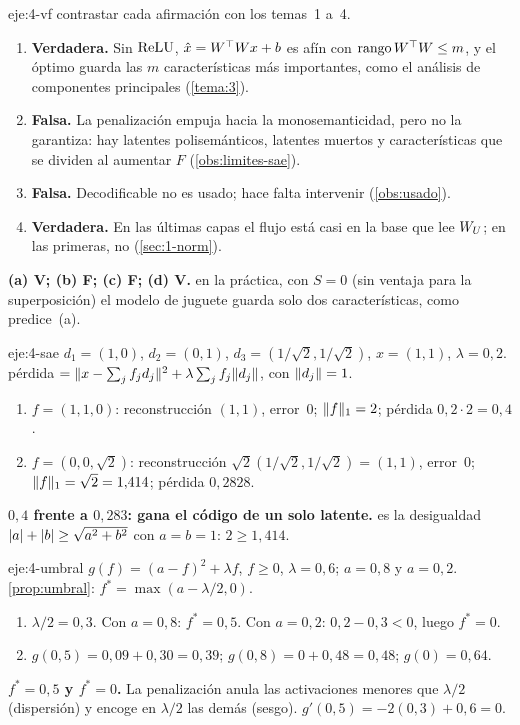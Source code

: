\begin{solucion}{eje:4-vf}
\planteamiento contrastar cada afirmación con los temas~1 a~4.
\pasos
\begin{enumerate}[label=(\alph*)]
  \item \textbf{Verdadera.} Sin $\operatorname{ReLU}$, $\hat x=W^{\top} Wx+b$ es afín con $\operatorname{rango} W^{\top} W\le m$, y el óptimo guarda las $m$ características más importantes, como el análisis de componentes principales (\cref{tema:3}).
  \item \textbf{Falsa.} La penalización empuja hacia la monosemanticidad, pero no la garantiza: hay latentes polisemánticos, latentes muertos y características que se dividen al aumentar $F$ (\cref{obs:limites-sae}).
  \item \textbf{Falsa.} Decodificable no es usado; hace falta intervenir (\cref{obs:usado}).
  \item \textbf{Verdadera.} En las últimas capas el flujo está casi en la base que lee $W_{U}$; en las primeras, no (\cref{sec:1-norm}).
\end{enumerate}
\resultado \textbf{(a) V; (b) F; (c) F; (d) V.}
\comprobacion en la práctica, con $S=0$ (sin ventaja para la superposición) el modelo de juguete guarda solo dos características, como predice~(a).
\end{solucion}

\begin{solucion}{eje:4-sae}
\datos $d_1=(1,0)$, $d_2=(0,1)$, $d_3=(1/\sqrt2,1/\sqrt2)$, $x=(1,1)$, $\lambda=0{,}2$.
\planteamiento pérdida $=\lVert x-\sum_jf_jd_j\rVert^{2}+\lambda\sum_jf_j\lVert d_j\rVert$, con $\lVert d_j\rVert=1$.
\pasos
\begin{enumerate}[label=\arabic*.]
  \item $f=(1,1,0)$: reconstrucción $(1,1)$, error~0; $\lVert f\rVert_1=2$; pérdida $0{,}2\cdot 2=0{,}4$.
  \item $f=(0,0,\sqrt2)$: reconstrucción $\sqrt2(1/\sqrt2,1/\sqrt2)=(1,1)$, error~0; $\lVert f\rVert_1=\sqrt2=1{,}414$; pérdida $0{,}2828$.
\end{enumerate}
\resultado \textbf{$0{,}4$ frente a $0{,}283$: gana el código de un solo latente.}
\comprobacion es la desigualdad $\lvert a\rvert+\lvert b\rvert\ge\sqrt{a^{2}+b^{2}}$ con $a=b=1$: $2\ge 1{,}414$.
\end{solucion}

\begin{solucion}{eje:4-umbral}
\datos $g(f)=(a-f)^{2}+\lambda f$, $f\ge 0$, $\lambda=0{,}6$; $a=0{,}8$ y $a=0{,}2$.
\planteamiento \cref{prop:umbral}: $f^{*}=\max(a-\lambda/2,0)$.
\pasos
\begin{enumerate}[label=\arabic*.]
  \item $\lambda/2=0{,}3$. Con $a=0{,}8$: $f^{*}=0{,}5$. Con $a=0{,}2$: $0{,}2-0{,}3<0$, luego $f^{*}=0$.
  \item $g(0{,}5)=0{,}09+0{,}30=0{,}39$; $g(0{,}8)=0+0{,}48=0{,}48$; $g(0)=0{,}64$.
\end{enumerate}
\resultado \textbf{$f^{*}=0{,}5$ y $f^{*}=0$.} La penalización anula las activaciones menores que $\lambda/2$ (dispersión) y encoge en $\lambda/2$ las demás (sesgo).
\comprobacion $g'(0{,}5)=-2(0{,}3)+0{,}6=0$.
\end{solucion}

